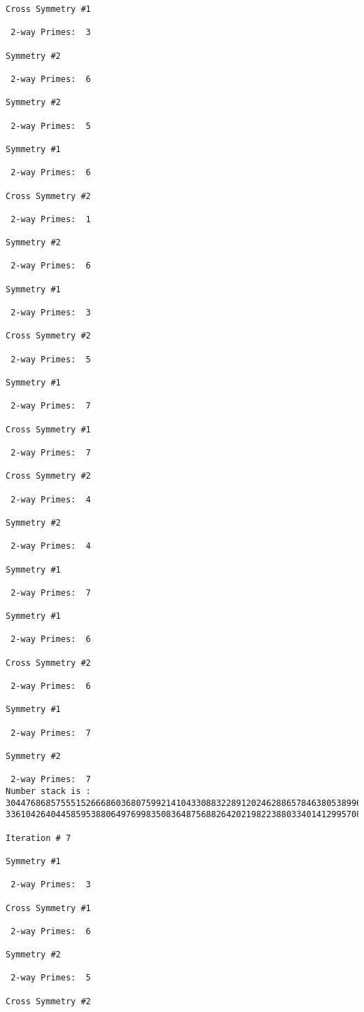 \begin{verbatim}
Cross Symmetry #1

 2-way Primes: 	3

Symmetry #2

 2-way Primes: 	6

Symmetry #2

 2-way Primes: 	5

Symmetry #1

 2-way Primes: 	6

Cross Symmetry #2

 2-way Primes: 	1

Symmetry #2

 2-way Primes: 	6

Symmetry #1

 2-way Primes: 	3

Cross Symmetry #2

 2-way Primes: 	5

Symmetry #1

 2-way Primes: 	7

Cross Symmetry #1

 2-way Primes: 	7

Cross Symmetry #2

 2-way Primes: 	4

Symmetry #2

 2-way Primes: 	4

Symmetry #1

 2-way Primes: 	7

Symmetry #1

 2-way Primes: 	6

Cross Symmetry #2

 2-way Primes: 	6

Symmetry #1

 2-way Primes: 	7

Symmetry #2

 2-way Primes: 	7
Number stack is :
30447686857555152666860368075992141043308832289120246288657846380538996794608835958544046240163340857
33610426404458595388064976998350836487568826420219822388033401412995708630686662515557586867440375804

Iteration #	7

Symmetry #1

 2-way Primes: 	3

Cross Symmetry #1

 2-way Primes: 	6

Symmetry #2

 2-way Primes: 	5

Cross Symmetry #2


\end{verbatim}
